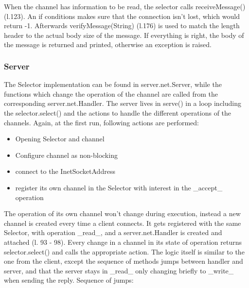 \documentclass[a4paper]{scrartcl}
\begin{document}
When the channel has information to be read, the selector calls receiveMessage() (l.123).
An if conditions makes sure that the connection isn't lost, which would return -1.
Afterwards verifyMessage(String) (l.176) is used to match the length header to the actual body size of the message.
If everything is right, the body of the message is returned and printed, otherwise an exception is raised.

\subsubsection{Server}

The Selector implementation can be found in server.net.Server, while the functions which change the operation of the channel are called from the corresponding server.net.Handler.
The server lives in serve() in a loop including the selector.select() and the actions to handle the different operations of the channels.
Again, at the first run, following actions are performed:
\begin{itemize}
        \item Opening Selector and channel
        \item Configure channel as non-blocking
        \item connect to the InetSocketAddress
        \item register its own channel in the Selector with interest in the _accept_ operation
\end{itemize}
The operation of its own channel won't change during execution, instead a new channel is created every time a client connects.
It gets registered with the same Selector, with operation _read_, and a server.net.Handler is created and attached (l. 93 - 98).
Every change in a channel in its state of operation returns selector.select() and calls the appropriate action.
The logic itself is similar to the one from the client, except the sequence of methods jumps between handler and server, and that the server stays in _read_ only changing briefly to _write_ when sending the reply.
Sequence of jumps:
\end{document}
